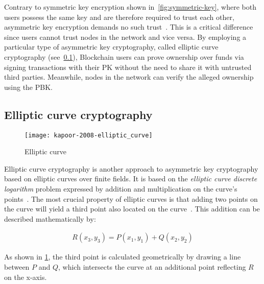 Contrary to symmetric key encryption shown in~\cref{fig:symmetric-key}, where both users possess the same key and are therefore required to trust each other, asymmetric key encryption demands no such trust~\autocites[84]{chandra_comparative_2014}[11]{yaga_blockchain_2018}.
This is a critical difference since users cannot trust nodes in the network and vice versa.
By employing a particular type of asymmetric key cryptography, called elliptic curve cryptography (see~\cref{subsec:elliptic-curve-cryptography}), \gls{Blockchain} users can prove ownership over funds via signing transactions with their \gls{PK} without the need to share it with untrusted third parties.
Meanwhile, nodes in the network can verify the alleged ownership using the \gls{PBK}.

\subsection{Elliptic curve cryptography}\label{subsec:elliptic-curve-cryptography}

\begin{figure}[H]
    \caption[Elliptic curve]{Elliptic curve~\autocite[5]{kapoor_elliptic_2008}}
    \label{fig:elliptic-curve}
    \begin{center}
        \texttt{[image: kapoor-2008-elliptic\_curve]}
    \end{center}
\end{figure}

Elliptic curve cryptography is another approach to asymmetric key cryptography based on elliptic curves over finite fields.
It is based on the \emph{elliptic curve discrete logarithm} problem expressed by addition and multiplication on the curve's points~\autocites[65]{antonopoulos_mastering_2017}[5]{kapoor_elliptic_2008}.
The most crucial property of elliptic curves is that adding two points on the curve will yield a third point also located on the curve~\autocite[5]{kapoor_elliptic_2008}.
This addition can be described mathematically by:

\begin{align}\label{eq:curve-addition}
    R(x_3,y_3)=P(x_1,y_1)+Q(x_2,y_2)
\end{align}

As shown in \cref{fig:elliptic-curve}, the third point is calculated geometrically by drawing a line between $P$ and $Q$, which intersects the curve at an additional point reflecting $R$ on the x-axis.

